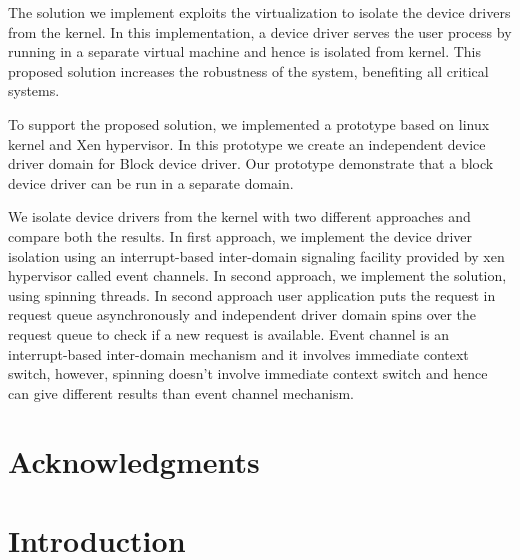 \documentclass[12pt]{report}
\begin{document}
The solution we implement exploits the virtualization to isolate the device drivers from the kernel. In this implementation, a device driver serves the user process by running in a separate virtual machine and hence is isolated from kernel. This proposed solution increases the robustness of the system, benefiting all critical systems.
 
To support the proposed solution, we implemented a prototype based on linux kernel and Xen hypervisor. In this prototype we create an independent device driver domain for Block device driver. Our prototype demonstrate that a block device driver can be run in a separate domain. 
 
We isolate device drivers from the kernel with two different approaches and compare both the results. In first approach, we implement the device driver isolation using an interrupt-based inter-domain signaling facility provided by xen hypervisor called event channels. In second approach, we implement the solution, using spinning threads. In second approach user application puts the request in request queue asynchronously and independent driver domain spins over the request queue to check if a new request is available. Event channel is an interrupt-based inter-domain mechanism and it involves immediate context switch, however, spinning doesn't involve immediate context switch and hence can give different results than event channel mechanism. 


\vfill


\pagebreak


\chapter*{Acknowledgments}


\tableofcontents
\pagebreak

\listoffigures
\pagebreak

\listoftables
\pagebreak

\pagestyle{myheadings}


\chapter{Introduction} 
\end{document}

